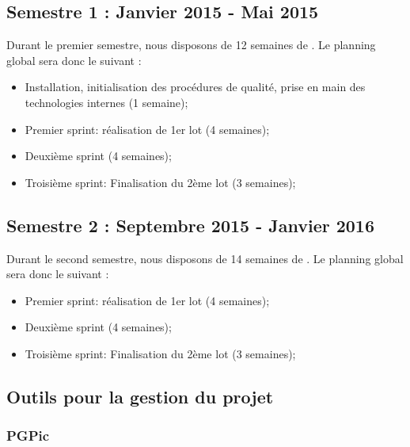 \subsection*{Semestre 1 : Janvier 2015 - Mai 2015}

Durant le premier semestre, nous disposons de 12 semaines de \PICCourt. Le planning global sera donc le suivant : 
\begin{itemize}
\item Installation, initialisation des procédures de qualité, prise en main des technologies internes (1 semaine);
\item Premier sprint: réalisation de 1er lot (4 semaines);
\item Deuxième sprint (4 semaines);
\item Troisième sprint: Finalisation du 2ème lot (3 semaines);
\end{itemize}

\subsection*{Semestre 2 : Septembre 2015 - Janvier 2016}

Durant le second semestre, nous disposons de 14 semaines de \PICCourt. Le planning global sera donc le suivant : 
\begin{itemize}
\item Premier sprint: réalisation de 1er lot (4 semaines);
\item Deuxième sprint (4 semaines);
\item Troisième sprint: Finalisation du 2ème lot (3 semaines);
\end{itemize}

\subsection{Outils pour la gestion du projet}


\subsubsection*{PGPic}

\subsubsection*{}

\subsubsection*{}

